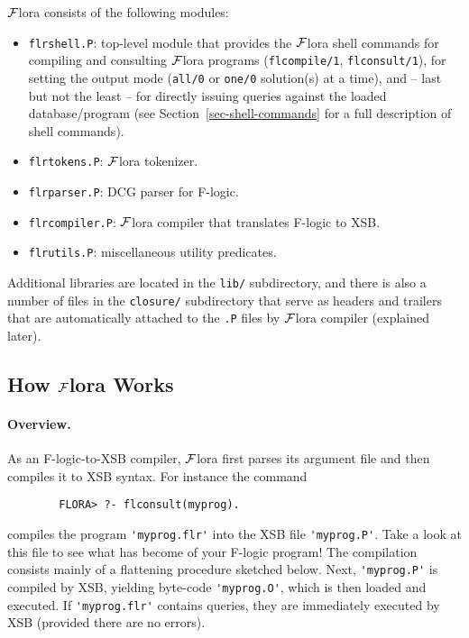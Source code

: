 \documentclass[11pt]{article}
\newcommand{\FLORA}{{\mbox{${\cal F}${\sc lora}}}\xspace}
\newcommand{\fl}{{F-logic}\xspace}
\begin{document}
\FLORA consists of the following modules:
\begin{itemize}
\item \texttt{flrshell.P}: top-level module that provides the \FLORA shell
  commands for compiling and consulting \FLORA programs
  (\texttt{flcompile/1}, \texttt{flconsult/1}), for setting the output mode
  (\texttt{all/0} or \texttt{one/0} solution(s) at a time), and -- last but
  not the least -- for directly issuing queries against the loaded
  database/program (see Section~\ref{sec-shell-commands} for a full
  description of shell commands).
\item \texttt{flrtokens.P}: \FLORA tokenizer.
\item \texttt{flrparser.P}: DCG parser for \fl.
\item \texttt{flrcompiler.P}: \FLORA compiler that translates \fl to XSB.
\item \texttt{flrutils.P}: miscellaneous utility predicates.
\end{itemize}
Additional libraries are located in the {\tt lib/} subdirectory, and there
is also a number of files in the {\tt closure/} subdirectory that serve as
headers and trailers that are automatically attached to the {\tt *.P} files by
\FLORA compiler (explained later).



\subsection{How \FLORA Works}



\paragraph{Overview.}

As an \fl-to-XSB compiler, \FLORA first parses its argument file and then
compiles it to XSB syntax. For instance the command
\begin{verbatim}
        FLORA> ?- flconsult(myprog).
\end{verbatim}
compiles the program \verb|'myprog.flr'| into the XSB file
\verb|'myprog.P'|.  Take a look at this file to see what has become of your
F-logic program! The compilation consists mainly of a flattening procedure
sketched below.  Next, \verb|'myprog.P'| is compiled by XSB, yielding
byte-code \verb|'myprog.O'|, which is then loaded and executed.  If
\verb|'myprog.flr'| contains queries, they are immediately executed by XSB
(provided there are no errors).
\end{document}
